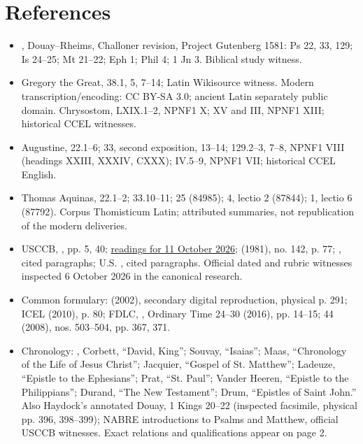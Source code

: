 \section{References}
\begin{itemize}
\item {}, Douay--Rheims, Challoner revision, Project Gutenberg 1581: Ps 22, 33, 129; Is 24--25; Mt 21--22; Eph 1; Phil 4; 1 Jn 3. Biblical study witness.
\item Gregory the Great,  38.1, 5, 7--14; Latin Wikisource witness. Modern transcription/encoding: CC BY-SA 3.0; ancient Latin separately public domain. Chrysostom,  LXIX.1--2, NPNF1 X;  XV and  III, NPNF1 XIII; historical CCEL witnesses.
\item Augustine,  22.1--6; 33, second exposition, 13--14; 129.2--3, 7--8, NPNF1 VIII (headings XXIII, XXXIV, CXXX);  IV.5--9, NPNF1 VII; historical CCEL English.
\item Thomas Aquinas,  22.1--2; 33.10--11;  25 (84985);  4, lectio 2 (87844);  1, lectio 6 (87792). Corpus Thomisticum Latin; attributed summaries, not republication of the modern deliveries.
\item USCCB, , pp. 5, 40; \href{https://bible.usccb.org/bible/readings/101126.cfm}{readings for 11 October 2026};  (1981), no. 142, p. 77; , cited paragraphs; U.S. , cited paragraphs. Official dated and rubric witnesses inspected 6 October 2026 in the canonical research.
\item Common formulary:  (2002), secondary digital reproduction, physical p. 291; ICEL  (2010), p. 80; FDLC, , Ordinary Time 24--30 (2016), pp. 14--15;  44 (2008), nos. 503--504, pp. 367, 371.
\item Chronology: , Corbett, ``David, King''; Souvay, ``Isaias''; Maas, ``Chronology of the Life of Jesus Christ''; Jacquier, ``Gospel of St. Matthew''; Ladeuze, ``Epistle to the Ephesians''; Prat, ``St. Paul''; Vander Heeren, ``Epistle to the Philippians''; Durand, ``The New Testament''; Drum, ``Epistles of Saint John.'' Also Haydock's annotated Douay, 1 Kings 20--22 (inspected facsimile, physical pp. 396, 398--399); NABRE introductions to Psalms and Matthew, official USCCB witnesses. Exact relations and qualifications appear on page 2.
\end{itemize}
